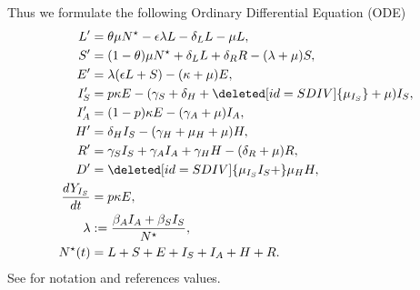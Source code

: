 Thus we formulate the following Ordinary Differential Equation (ODE)
\begin{equation}
	\label{eqn:base_dynamics}
    \begin{aligned}
        L' & = \theta \mu N^{\star}
        	-\epsilon \lambda L - \delta_L L - \mu L,
        \\
        S' & =
            (1 - \theta)\mu N^\star + \delta_L  L + \delta_R R
            - (\lambda + \mu) S,
        \\
        E' & =
            \lambda (\epsilon L + S) - (\kappa + \mu) E,
        \\
        I_S' & =
            p \kappa E -
            (\gamma_S +
                \delta_H +
                \deleted[id=SDIV]{\mu_{I_S}} +
                \mu) I_S,
        \\
        I_A' &=
            (1 - p) \kappa E - (\gamma_A + \mu) I_A,
        \\
        H' &=
            \delta_H I_S - (\gamma_H + \mu_H + \mu) H,
        \\
        R' & =
            \gamma_S I_S + \gamma_A I_A + \gamma_H H - (\delta_R + \mu) R,
        \\
        D' &=
            \deleted[id=SDIV]{\mu_{I_S} I_S +} \mu_H H,
        \\
        \frac{dY_{I_S}}{dt} &  = p \kappa E,
        \\
        \lambda &:=
            \frac{\beta_A I_A + \beta_S I_S}{N^{\star}},
        \\
        N^{\star}(t) &=
            L + S + E +
            I_S + I_A +
            H + R .
    \end{aligned}
\end{equation}
%
     See  for notation and references
     values.
